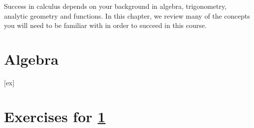 Success in calculus depends on your background in algebra, trigonometry, 
analytic geometry and functions. In this chapter, we review many of the
concepts you will need to be familiar with in order to succeed in this course.

\section{Algebra}\label{sec:Algebra}










[ex]
\section*{Exercises for \ref{sec:Algebra}}

